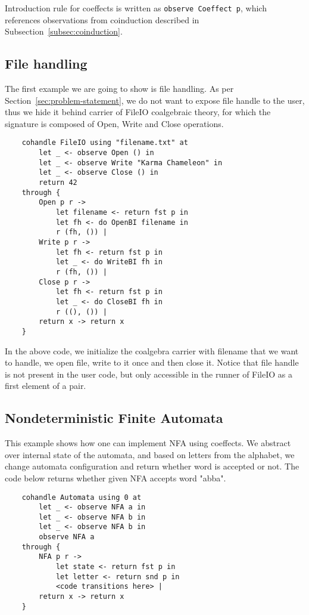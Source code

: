 \documentclass[declaration,shortabstract]{iithesis}
\theoremstyle{definition} \newtheorem{definition}{Definition}[chapter]
\theoremstyle{remark} \newtheorem{remark}[definition]{Observation}
\theoremstyle{plain} \newtheorem{theorem}[definition]{Theorem}
\theoremstyle{plain} \newtheorem{lemma}[definition]{Lemma}
\begin{document}
    Introduction rule for coeffects is written as \verb!observe Coeffect p!,
    which references observations from coinduction described in
    Subsection~\ref{subsec:coinduction}.

    \subsection{File handling}

    The first example we are going to show is file handling. As per
    Section~\ref{sec:problem-statement}, we do not want to expose file handle
    to the user, thus we hide it behind carrier of FileIO coalgebraic theory,
    for which the signature is composed of Open, Write and Close operations.

\begin{verbatim}
    cohandle FileIO using "filename.txt" at
        let _ <- observe Open () in
        let _ <- observe Write "Karma Chameleon" in
        let _ <- observe Close () in
        return 42
    through {
        Open p r ->
            let filename <- return fst p in
            let fh <- do OpenBI filename in
            r (fh, ()) |
        Write p r ->
            let fh <- return fst p in
            let _ <- do WriteBI fh in
            r (fh, ()) |
        Close p r ->
            let fh <- return fst p in
            let _ <- do CloseBI fh in
            r ((), ()) |
        return x -> return x
    }
\end{verbatim}

    In the above code, we initialize the coalgebra carrier with filename that
    we want to handle, we open file, write to it once and then close it. Notice
    that file handle is not present in the user code, but only accessible in
    the runner of FileIO as a first element of a pair.

    \subsection{Nondeterministic Finite Automata}

    This example shows how one can implement NFA using coeffects. We abstract
    over internal state of the automata, and based on letters from the alphabet,
    we change automata configuration and return whether word is accepted or not.
    The code below returns whether given NFA accepts word "abba".

\begin{verbatim}
    cohandle Automata using 0 at
        let _ <- observe NFA a in
        let _ <- observe NFA b in
        let _ <- observe NFA b in
        observe NFA a
    through {
        NFA p r ->
            let state <- return fst p in
            let letter <- return snd p in
            <code transitions here> |
        return x -> return x
    }
\end{verbatim}
\end{document}
